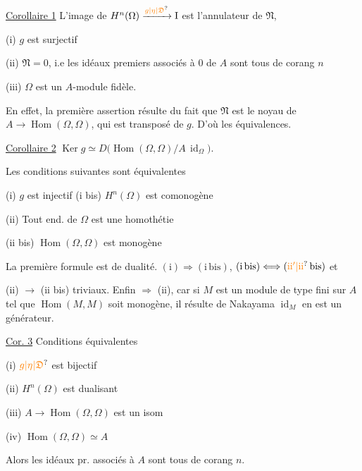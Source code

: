 \uline{Corollaire 1} L'image de $H^n(\Omega)\xrightarrow{\unsure{g|\eta|\mathfrak D}}\mathrm I$ est l'annulateur
de $\mathfrak N$,   

(i) $g$ est surjectif

(ii) $\mathfrak N=0$, i.e les idéaux premiers associés à $0$ de $A$
sont tous de  corang $n$

(iii) $\Omega$ est un $A$-module fidèle.

En effet, la première assertion résulte du
fait que $\mathfrak N$ est le noyau de $A\to\operatorname{Hom}(\Omega,\Omega)$,
qui est transposé de $g$. D'où les équivalences.

\uline{Corollaire 2} $\operatorname{Ker}g\simeq D\bigl(\operatorname{Hom}(\Omega,\Omega)/A\,\operatorname{id}_{\Omega}\bigr)$.

Les conditions suivantes sont équivalentes

(i) $g$ est injectif \qquad (i bis) $H^n(\Omega)$ est comonogène

(ii) Tout end. de $\Omega$ est une homothétie

(ii bis) $\operatorname{Hom}(\Omega,\Omega)$ est monogène

La première formule est de dualité.
$(\mathrm i)\Rightarrow(\mathrm{i\,bis})$,  $(\mathrm{i\,bis})\Longleftrightarrow(\unsure{\mathrm{ii}'|\mathrm{ii}}\,\mathrm{bis})$ et

(ii) $\longrightarrow$ (ii bis) triviaux. Enfin  $\Rightarrow$ (ii), car
si $M$ est un module de type fini sur $A$ tel que
$\operatorname{Hom}(M,M)$ soit monogène, il résulte de Nakayama 
$\operatorname{id}_M$ en est un générateur.

\uline{Cor. 3} Conditions équivalentes

(i) $\unsure{g|\eta|\mathfrak D}$ est bijectif

(ii) $H^n(\Omega)$ est dualisant

(iii) $A\to\operatorname{Hom}(\Omega,\Omega)$ est un isom

(iv) $\operatorname{Hom}(\Omega,\Omega)\simeq A$

 Alors  les idéaux pr. associés à $A$
sont tous de  corang $n$.

